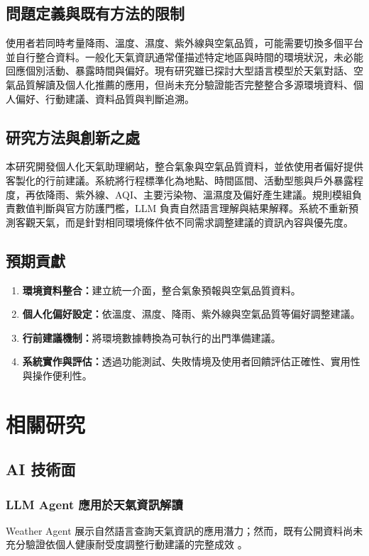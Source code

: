 \documentclass[conference]{IEEEtran}
\begin{document}
\subsection{問題定義與既有方法的限制}
使用者若同時考量降雨、溫度、濕度、紫外線與空氣品質，可能需要切換多個平台並自行整合資料。一般化天氣資訊通常僅描述特定地區與時間的環境狀況，未必能回應個別活動、暴露時間與偏好。現有研究雖已探討大型語言模型於天氣對話、空氣品質解讀及個人化推薦的應用，但尚未充分驗證能否完整整合多源環境資料、個人偏好、行動建議、資料品質與判斷追溯。

\subsection{研究方法與創新之處}
本研究開發個人化天氣助理網站，整合氣象與空氣品質資料，並依使用者偏好提供客製化的行前建議。系統將行程標準化為地點、時間區間、活動型態與戶外暴露程度，再依降雨、紫外線、AQI、主要污染物、溫濕度及偏好產生建議。規則模組負責數值判斷與官方防護門檻，LLM 負責自然語言理解與結果解釋。系統不重新預測客觀天氣，而是針對相同環境條件依不同需求調整建議的資訊內容與優先度。

\subsection{預期貢獻}
\begin{enumerate}[leftmargin=*]
\item \textbf{環境資料整合：}建立統一介面，整合氣象預報與空氣品質資料。
\item \textbf{個人化偏好設定：}依溫度、濕度、降雨、紫外線與空氣品質等偏好調整建議。
\item \textbf{行前建議機制：}將環境數據轉換為可執行的出門準備建議。
\item \textbf{系統實作與評估：}透過功能測試、失敗情境及使用者回饋評估正確性、實用性與操作便利性。
\end{enumerate}

\section{相關研究}

\subsection{AI 技術面}
\subsubsection{LLM Agent 應用於天氣資訊解讀}
Weather Agent 展示自然語言查詢天氣資訊的應用潛力；然而，既有公開資料尚未充分驗證依個人健康耐受度調整行動建議的完整成效 \cite{weathernews2025}。
\end{document}
